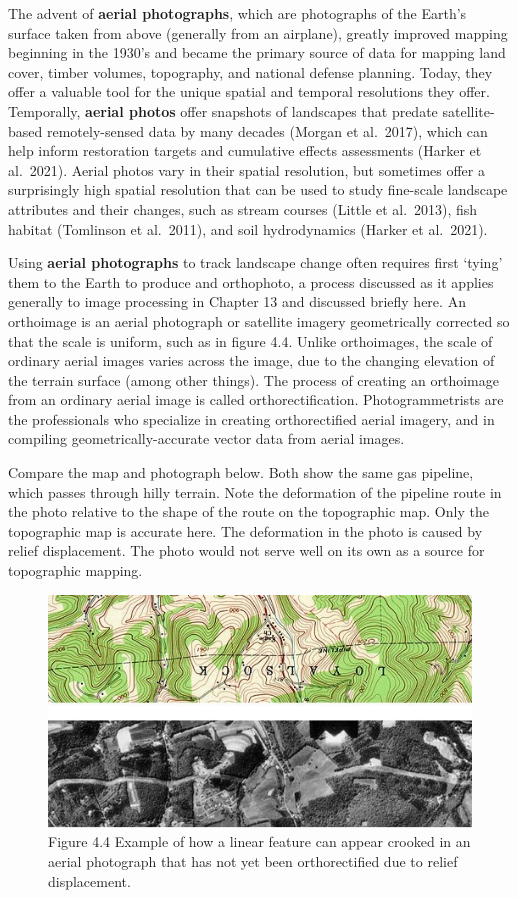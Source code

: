 \documentclass[
]{book}
\begin{document}
The advent of \textbf{aerial photographs}, which are photographs of the Earth's surface taken from above (generally from an airplane), greatly improved mapping beginning in the 1930's and became the primary source of data for mapping land cover, timber volumes, topography, and national defense planning. Today, they offer a valuable tool for the unique spatial and temporal resolutions they offer. Temporally, \textbf{aerial photos} offer snapshots of landscapes that predate satellite-based remotely-sensed data by many decades (Morgan et al.~2017), which can help inform restoration targets and cumulative effects assessments (Harker et al.~2021). Aerial photos vary in their spatial resolution, but sometimes offer a surprisingly high spatial resolution that can be used to study fine-scale landscape attributes and their changes, such as stream courses (Little et al.~2013), fish habitat (Tomlinson et al.~2011), and soil hydrodynamics (Harker et al.~2021).

Using \textbf{aerial photographs} to track landscape change often requires first `tying' them to the Earth to produce and orthophoto, a process discussed as it applies generally to image processing in Chapter 13 and discussed briefly here. An orthoimage is an aerial photograph or satellite imagery geometrically corrected so that the scale is uniform, such as in figure 4.4. Unlike orthoimages, the scale of ordinary aerial images varies across the image, due to the changing elevation of the terrain surface (among other things). The process of creating an orthoimage from an ordinary aerial image is called orthorectification. Photogrammetrists are the professionals who specialize in creating orthorectified aerial imagery, and in compiling geometrically-accurate vector data from aerial images.

Compare the map and photograph below. Both show the same gas pipeline, which passes through hilly terrain. Note the deformation of the pipeline route in the photo relative to the shape of the route on the topographic map. Only the topographic map is accurate here. The deformation in the photo is caused by relief displacement. The photo would not serve well on its own as a source for topographic mapping.

\begin{figure}
\centering
\includegraphics{images/04-crooked-aerialphoto.png}
\caption{Figure 4.4 Example of how a linear feature can appear crooked in an aerial photograph that has not yet been orthorectified due to relief displacement.}
\end{figure}
\end{document}
